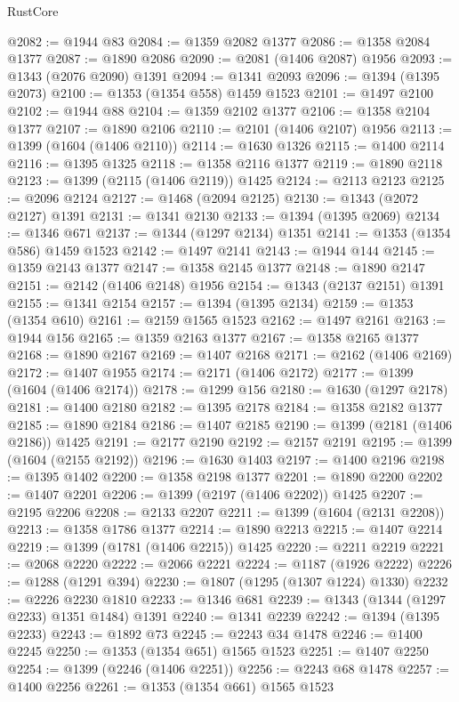 \begin{lexlean}{RustCore}
\begin{coremodule}
@2082 := @1944 @83
@2084 := @1359 @2082 @1377
@2086 := @1358 @2084 @1377
@2087 := @1890 @2086
@2090 := @2081 (@1406 @2087) @1956
@2093 := @1343 (@2076 @2090) @1391
@2094 := @1341 @2093
@2096 := @1394 (@1395 @2073)
@2100 := @1353 (@1354 @558) @1459 @1523
@2101 := @1497 @2100
@2102 := @1944 @88
@2104 := @1359 @2102 @1377
@2106 := @1358 @2104 @1377
@2107 := @1890 @2106
@2110 := @2101 (@1406 @2107) @1956
@2113 := @1399 (@1604 (@1406 @2110))
@2114 := @1630 @1326
@2115 := @1400 @2114
@2116 := @1395 @1325
@2118 := @1358 @2116 @1377
@2119 := @1890 @2118
@2123 := @1399 (@2115 (@1406 @2119)) @1425
@2124 := @2113 @2123
@2125 := @2096 @2124
@2127 := @1468 (@2094 @2125)
@2130 := @1343 (@2072 @2127) @1391
@2131 := @1341 @2130
@2133 := @1394 (@1395 @2069)
@2134 := @1346 @671
@2137 := @1344 (@1297 @2134) @1351
@2141 := @1353 (@1354 @586) @1459 @1523
@2142 := @1497 @2141
@2143 := @1944 @144
@2145 := @1359 @2143 @1377
@2147 := @1358 @2145 @1377
@2148 := @1890 @2147
@2151 := @2142 (@1406 @2148) @1956
@2154 := @1343 (@2137 @2151) @1391
@2155 := @1341 @2154
@2157 := @1394 (@1395 @2134)
@2159 := @1353 (@1354 @610)
@2161 := @2159 @1565 @1523
@2162 := @1497 @2161
@2163 := @1944 @156
@2165 := @1359 @2163 @1377
@2167 := @1358 @2165 @1377
@2168 := @1890 @2167
@2169 := @1407 @2168
@2171 := @2162 (@1406 @2169)
@2172 := @1407 @1955
@2174 := @2171 (@1406 @2172)
@2177 := @1399 (@1604 (@1406 @2174))
@2178 := @1299 @156
@2180 := @1630 (@1297 @2178)
@2181 := @1400 @2180
@2182 := @1395 @2178
@2184 := @1358 @2182 @1377
@2185 := @1890 @2184
@2186 := @1407 @2185
@2190 := @1399 (@2181 (@1406 @2186)) @1425
@2191 := @2177 @2190
@2192 := @2157 @2191
@2195 := @1399 (@1604 (@2155 @2192))
@2196 := @1630 @1403
@2197 := @1400 @2196
@2198 := @1395 @1402
@2200 := @1358 @2198 @1377
@2201 := @1890 @2200
@2202 := @1407 @2201
@2206 := @1399 (@2197 (@1406 @2202)) @1425
@2207 := @2195 @2206
@2208 := @2133 @2207
@2211 := @1399 (@1604 (@2131 @2208))
@2213 := @1358 @1786 @1377
@2214 := @1890 @2213
@2215 := @1407 @2214
@2219 := @1399 (@1781 (@1406 @2215)) @1425
@2220 := @2211 @2219
@2221 := @2068 @2220
@2222 := @2066 @2221
@2224 := @1187 (@1926 @2222)
@2226 := @1288 (@1291 @394)
@2230 := @1807 (@1295 (@1307 @1224) @1330)
@2232 := @2226 @2230 @1810
@2233 := @1346 @681
@2239 := @1343 (@1344 (@1297 @2233) @1351 @1484) @1391
@2240 := @1341 @2239
@2242 := @1394 (@1395 @2233)
@2243 := @1892 @73
@2245 := @2243 @34 @1478
@2246 := @1400 @2245
@2250 := @1353 (@1354 @651) @1565 @1523
@2251 := @1407 @2250
@2254 := @1399 (@2246 (@1406 @2251))
@2256 := @2243 @68 @1478
@2257 := @1400 @2256
@2261 := @1353 (@1354 @661) @1565 @1523

\end{coremodule}
\end{lexlean}
